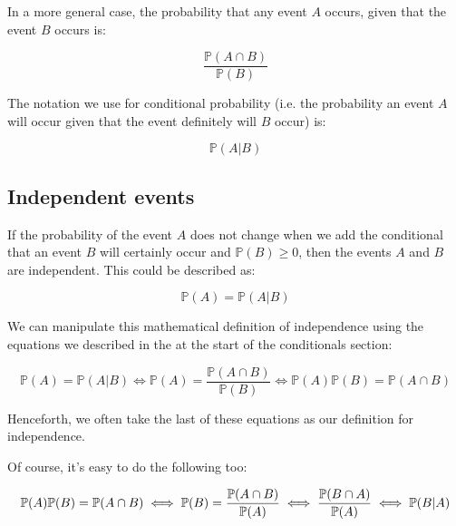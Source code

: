 In a more general case, the probability that any event $A$ occurs, given that
the event $B$ occurs is:

\begin{dmath*}
	\frac{\mathbb{P}(A \cap B)}{\mathbb{P}(B)}
\end{dmath*}

The notation we use for conditional probability (i.e. the probability an event
$A$ will occur given that the event definitely will $B$ occur) is:

\begin{dmath*}
	\mathbb{P}(A|B)
\end{dmath*}


\subsection{Independent events}

If the probability of the event $A$ does not change when we add the conditional
that an event $B$ will certainly occur and $\mathbb{P}(B) \ge 0$, then the
events $A$ and $B$ are independent. This could be described as:

\begin{dmath*}
	{\mathbb{P}(A) = \mathbb{P}(A|B)}
\end{dmath*}

We can manipulate this mathematical definition of independence using the
equations we described in the at the start of the conditionals section:

\begin{dmath*}
	{\mathbb{P}(A) = \mathbb{P}(A|B)} \iff {\mathbb{P}(A) = \frac{\mathbb{P}(A \cap B)}{\mathbb{P}(B)}} \iff {\mathbb{P}(A)\mathbb{P}(B) = \mathbb{P}(A \cap B)}
\end{dmath*}

Henceforth, we often take the last of these equations as our definition for
independence.

Of course, it's easy to do the following too:

\begin{dmath*}
	{\mathbb{P}(A)\mathbb{P}(B) = \mathbb{P}(A \cap B)} \iff {\mathbb{P}(B) = \frac{\mathbb{P}(A \cap B)}{\mathbb{P}(A)}} \iff {\frac{\mathbb{P}(B \cap A)}{\mathbb{P}(A)}} \iff {\mathbb{P}(B|A)}\\	
\end{dmath*}

